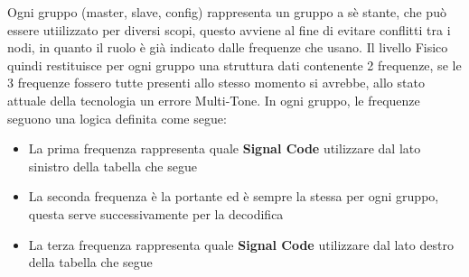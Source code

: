 \begin{table}[H]
\centering
\label{tab:master_slave_config}
\caption{Struttura di comunicazione tra Livello Bit e Livello Fisico}
\end{table}

Ogni gruppo (master, slave, config) rappresenta un gruppo a sè stante, che può essere utiilizzato per diversi scopi, 
questo avviene al fine di evitare conflitti tra i nodi, in quanto il ruolo è già indicato dalle frequenze che usano.
Il livello Fisico quindi restituisce per ogni gruppo una struttura dati contenente 2 frequenze, se le 3 frequenze fossero tutte presenti allo stesso momento si avrebbe,
allo stato attuale della tecnologia un errore Multi-Tone.
In ogni gruppo, le frequenze seguono una logica definita come segue:
\begin{itemize}
\item La prima frequenza rappresenta quale \textbf{Signal Code} utilizzare dal lato sinistro della tabella che segue
\item La seconda frequenza è la portante ed è sempre la stessa per ogni gruppo, questa serve successivamente per la decodifica
\item La terza frequenza rappresenta quale \textbf{Signal Code} utilizzare dal lato destro della tabella che segue
\end{itemize}



